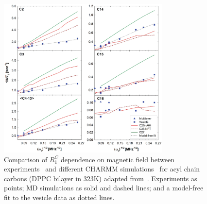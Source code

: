 \documentclass[aps,prl,superscriptaddress,twocolumn]{revtex4}
\begin{document}
\begin{figure}[]
  \includegraphics[width=8.6cm]{../Fig/RdisperisonCHARMM.eps}
\newline
  \caption{\label{RdispersionCHARMM}
    Comparison of $R_1^{C}$ dependence on magnetic field between experiments~\cite{brown83,klauda08a} and different CHARMM simulations~\cite{klauda10} 
    for acyl chain carbons (DPPC bilayer in 323K) adapted from~\cite{klauda10}.
    Experiments as points; MD simulations as solid and dashed lines; and a model-free fit to the vesicle data as dotted lines. 
     } 
\end{figure}
\end{document}
